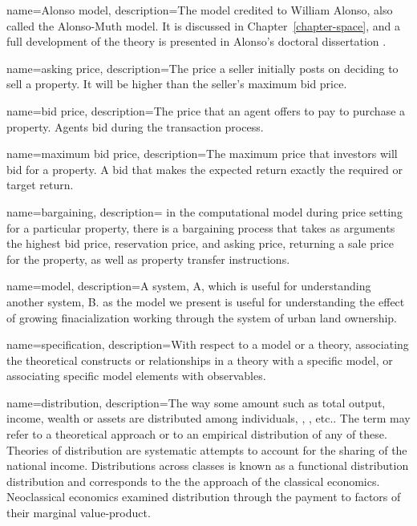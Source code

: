 {
name=Alonso model,
description={The model credited to William Alonso, also called the Alonso-Muth model. It is discussed in Chapter~\ref{chapter-space}, and a full development of the theory is presented in Alonso's doctoral dissertation \cite{alonsoTheoryUrbanLand1960}.} %
}

{
name=asking price,
description={The price a seller initially posts on deciding to sell a property. It will be higher than the seller's maximum bid price.}
}

{
name=bid price,
description={The %
price that an agent offers to pay to purchase a property. Agents bid during the transaction process.} %
}

{
name=maximum bid price,
description={The maximum price that investors will bid for a property. A bid that makes the expected return exactly the required or  target return.}
}

{
name=bargaining,
description= {in the computational model during price setting for a particular property, there is a bargaining process that takes as arguments the highest bid price, reservation price, and asking price, returning a sale price for the property, as well as property transfer instructions.}
}


{
name=model,
description={A system, A, which is useful for understanding another system, B. as the model we present is useful for understanding the effect of growing finacialization working through the system of urban land ownership.}
}

{
name=specification,
description={With respect to a model or a theory, associating the theoretical constructs or relationships in a theory with a specific model, or associating specific model elements with observables.}
}

{
name=distribution,
description={The way some amount such as total \gls{output}, income, \gls{wealth} or assets are distributed among individuals, , , etc.. The term may refer to a theoretical approach or to an empirical distribution of any of these. Theories of distribution are systematic attempts to account for the sharing of the national income.  Distributions across classes is known as a functional distribution distribution and  corresponds to the the approach of the \gls{classical economics}. Neoclassical economics examined distribution through the payment to factors of their \gls{marginal value-product}.}
}

